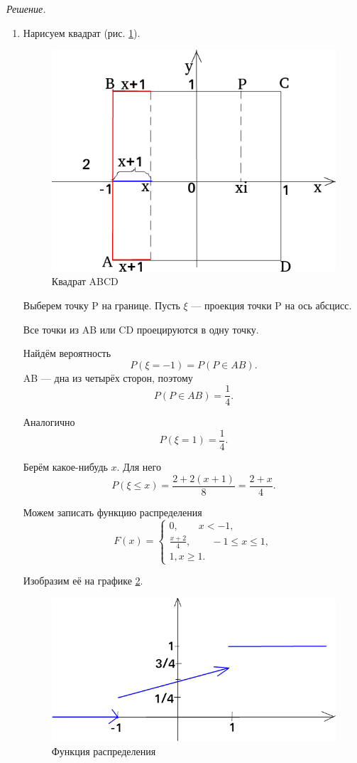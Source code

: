 \textit{Решение.}
\begin{enumerate}[label=\alph*)]
\item Нарисуем квадрат (рис. \ref{fig:108}).

\begin{figure}[h!]
  \centering
  \includegraphics[width=.4\textwidth]{./pictures/10_8.png}
  \caption{Квадрат ABCD}
  \label{fig:108}
\end{figure}

Выберем точку P на границе.
Пусть $ \xi $ --- проекция точки P на ось абсцисс.

Все точки из AB или CD проецируются в одну точку.

Найдём вероятность
$$P \left( \xi = -1 \right) =
P \left( P \in AB \right).$$
AB --- дна из четырёх сторон, поэтому
$$P \left( P \in AB \right) =
\frac{1}{4}.$$

Аналогично
$$P \left( \xi = 1 \right) =
\frac{1}{4}.$$

Берём какое-нибудь $x$.
Для него
$$P \left( \xi \leq x \right) =
\frac{2+2 \left( x+1 \right) }{8} =
\frac{2+x}{4}.$$

Можем записать функцию распределения
$$F \left( x \right) =
\begin{cases}
0, \qquad x < -1, \\
\frac{x+2}{4}, \qquad -1 \leq x \leq 1, \\
1, x \geq 1.
\end{cases}$$

Изобразим её на графике \ref{fig:1081}.

\begin{figure}[h!]
  \centering
  \includegraphics[width=.4\textwidth]{./pictures/10_8_1.png}
  \caption{Функция распределения}
  \label{fig:1081}
\end{figure}


\end{enumerate}
